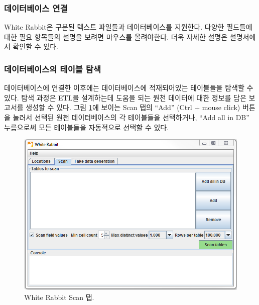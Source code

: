 \documentclass[11pt]{book}
\theoremstyle{definition}
\theoremstyle{definition}
\theoremstyle{definition}
\theoremstyle{remark}
\begin{document}
\subsubsection*{데이터베이스 연결}\label{-}

White Rabbit은 구분된 텍스트 파일들과 데이터베이스를 지원한다. 다양한
필드들에 대한 필요 항목들의 설명을 보려면 마우스를 올려야한다. 더욱
자세한 설명은 설명서에서 확인할 수 있다.

\subsubsection*{데이터베이스의 테이블 탐색}\label{--}

데이터베이스에 연결한 이후에는 데이터베이스에 적재되어있는 테이블들을
탐색할 수 있다. 탐색 과정은 ETL을 설계하는데 도움을 되는 원천 데이터에
대한 정보를 담은 보고서를 생성할 수 있다. 그림
\ref{fig:WhiteRabbitAddTables}에 보이는 Scan 탭의 ``Add'' (Ctrl + mouse
click) 버튼을 눌러서 선택된 원천 데이터베이스의 각 테이블들을
선택하거나, ``Add all in DB'' 누름으로써 모든 테이블들을 자동적으로
선택할 수 있다.

\begin{figure}

{\centering \includegraphics[width=1\linewidth]{images/ExtractTransformLoad/WhiteRabbitAddTables} 

}

\caption{White Rabbit Scan 탭.}\label{fig:WhiteRabbitAddTables}
\end{figure}
\end{document}
